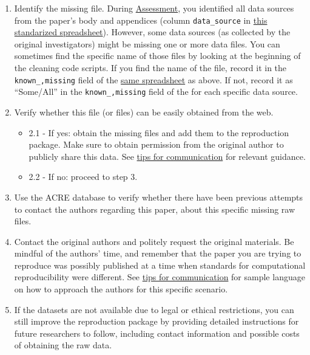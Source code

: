 \documentclass[]{book}
\providecommand{\tightlist}{%
  \setlength{\itemsep}{0pt}\setlength{\parskip}{0pt}}
\begin{document}
\begin{enumerate}
\def\labelenumi{\arabic{enumi}.}
\tightlist
\item
  Identify the missing file. During \protect\hyperlink{assessment}{Assessment}, you identified all data sources from the paper's body and appendices (column \texttt{data\_source} in \href{https://docs.google.com/spreadsheets/d/1LUIdVFH0OfR70C7z07TYeE-uWzKI_JIeWUMaYhqEKK0/edit\#gid=0\&range=A1}{this standarized spreadsheet}). However, some data sources (as collected by the original investigators) might be missing one or more data files. You can sometimes find the specific name of those files by looking at the beginning of the cleaning code scripts. If you find the name of the file, record it in the \texttt{known\_,missing} field of the \href{https://docs.google.com/spreadsheets/d/1LUIdVFH0OfR70C7z07TYeE-uWzKI_JIeWUMaYhqEKK0/edit\#gid=0\&range=A1}{same spreadsheet} as above. If not, record it as ``Some/All'' in the \texttt{known\_,missing} field of the for each specific data source.\\
\item
  Verify whether this file (or files) can be easily obtained from the web.

  \begin{itemize}
  \tightlist
  \item
    2.1 - If yes: obtain the missing files and add them to the reproduction package. Make sure to obtain permission from the original author to publicly share this data. See \href{https://bitss.github.io/ACRE/guidance-for-a-constructive-exchange-between-reproducers-and-original-authors.html}{tips for communication} for relevant guidance.\\
  \item
    2.2 - If no: proceed to step 3.\\
  \end{itemize}
\item
  Use the ACRE database to verify whether there have been previous attempts to contact the authors regarding this paper, about this specific missing raw files.\\
\item
  Contact the original authors and politely request the original materials. Be mindful of the authors' time, and remember that the paper you are trying to reproduce was possibly published at a time when standards for computational reproducibility were different. See \href{https://bitss.github.io/ACRE/guidance-for-a-constructive-exchange-between-reproducers-and-original-authors.html}{tips for communication} for sample language on how to approach the authors for this specific scenario.\\
\item
  If the datasets are not available due to legal or ethical restrictions, you can still improve the reproduction package by providing detailed instructions for future researchers to follow, including contact information and possible costs of obtaining the raw data.
\end{enumerate}
\end{document}
